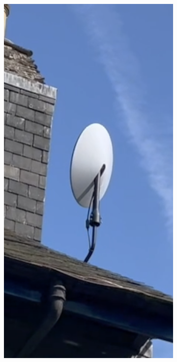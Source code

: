 \begin{figure}
    \centering
    \begin{subfigure}{.23235\textwidth}
        \centering\includegraphics[width=\textwidth]{img/stowed.png}

\end{subfigure}
\end{figure}
